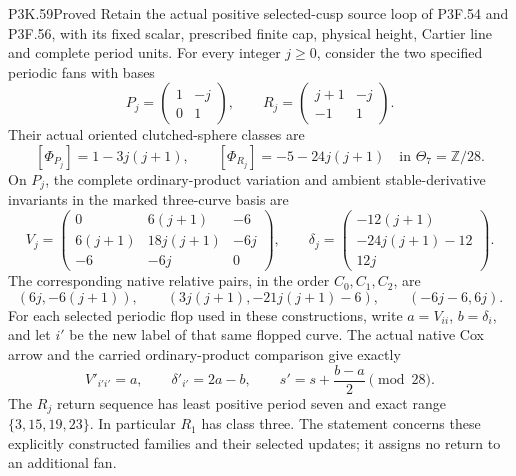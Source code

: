 \begin{statement}{P3K.59}{Proved}
Retain the actual positive selected-cusp source loop of
P3F.54 and P3F.56, with its fixed scalar, prescribed finite cap,
physical height, Cartier line and complete period units. For every
integer \(j\geq0\), consider the two specified periodic fans with bases
\[
 P_j=\begin{pmatrix}1&-j\\0&1\end{pmatrix},\qquad
 R_j=\begin{pmatrix}j+1&-j\\-1&1\end{pmatrix}.
\]
Their actual oriented clutched-sphere classes are
\[
 [\Phi_{P_j}]=1-3j(j+1),\qquad
 [\Phi_{R_j}]=-5-24j(j+1)\quad\text{in }\Theta_7=\mathbb Z/28.
\]
On \(P_j\), the complete ordinary-product variation and ambient
stable-derivative invariants in the marked three-curve basis are
\[
 V_j=\begin{pmatrix}
 0&6(j+1)&-6\\
 6(j+1)&18j(j+1)&-6j\\
 -6&-6j&0
 \end{pmatrix},\qquad
 \delta_j=\begin{pmatrix}-12(j+1)\\-24j(j+1)-12\\12j\end{pmatrix}.
\]
The corresponding native relative pairs, in the order \(C_0,C_1,C_2\), are
\[
 (6j,-6(j+1)),\qquad
 (3j(j+1),-21j(j+1)-6),\qquad
 (-6j-6,6j).
\]
For each selected periodic flop used in these constructions, write
\(a=V_{ii}\), \(b=\delta_i\), and let \(i'\) be the new label of that
same flopped curve. The actual native Cox arrow and the carried
ordinary-product comparison give exactly
\[
 V'_{i'i'}=a,\qquad \delta'_{i'}=2a-b,\qquad
 s'=s+\frac{b-a}{2}\pmod {28}.
\]
The \(R_j\) return sequence has least positive period seven and exact
range \(\{3,15,19,23\}\). In particular \(R_1\) has class three.
The statement concerns these explicitly constructed families and their
selected updates; it assigns no return to an additional fan.
\end{statement}
